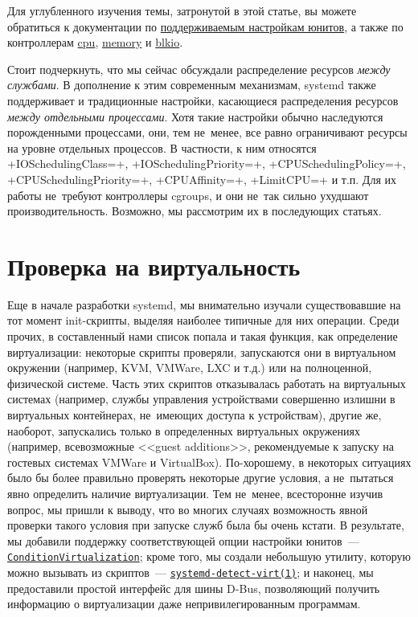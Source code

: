 \documentclass[10pt,oneside,a4paper]{article}
\newcommand{\hreftt}[2]{\href{#1}{\texttt{#2}}}
\begin{document}
Для углубленного изучения темы, затронутой в этой статье, вы можете обратиться к
документации по
\href{http://www.freedesktop.org/software/systemd/man/systemd.resource-control.html}%
{поддерживаемым настройкам юнитов}, а также по контроллерам 
\href{http://www.kernel.org/doc/Documentation/scheduler/sched-design-CFS.txt}{cpu},
\href{http://www.kernel.org/doc/Documentation/cgroups/memory.txt}{memory} и
\href{http://www.kernel.org/doc/Documentation/cgroups/blkio-controller.txt}{blkio}.

Стоит подчеркнуть, что мы сейчас обсуждали распределение ресурсов \emph{между
службами}. В дополнение к этим современным механизмам, systemd также
поддерживает и традиционные настройки, касающиеся распределения ресурсов
\emph{между отдельными процессами}. Хотя такие настройки обычно наследуются
порожденными процессами, они, тем не~менее, все равно ограничивают ресурсы
на уровне отдельных процессов. В частности, к ним относятся +IOSchedulingClass=+,
+IOSchedulingPriority=+, +CPUSchedulingPolicy=+, +CPUSchedulingPriority=+,
+CPUAffinity=+, +LimitCPU=+ и т.п. Для их работы не~требуют контроллеры cgroups,
и они не~так сильно ухудшают производительность. Возможно, мы рассмотрим их в
последующих статьях.

\section{Проверка на виртуальность}

Еще в начале разработки systemd, мы внимательно изучали существовавшие на тот
момент init-скрипты, выделяя наиболее типичные для них операции. Среди прочих, в
составленный нами список попала и такая функция, как определение виртуализации:
некоторые скрипты проверяли, запускаются они в виртуальном окружении (например,
KVM, VMWare, LXC и т.д.) или на полноценной, физической системе. Часть этих
скриптов отказывалась работать на виртуальных системах (например, службы
управления устройствами совершенно излишни в виртуальных контейнерах, не~имеющих
доступа к устройствам), другие же, наоборот, запускались только в определенных 
виртуальных окружениях (например, всевозможные <<guest additions>>,
рекомендуемые к запуску на гостевых системах VMWare и VirtualBox). По-хорошему,
в некоторых ситуациях было бы более правильно проверять некоторые другие
условия, а не~пытаться явно определить наличие виртуализации. Тем не~менее,
всесторонне изучив вопрос, мы пришли к выводу, что во многих случаях
возможность явной проверки такого условия при запуске служб была бы очень
кстати. В результате, мы добавили поддержку соответствующей опции настройки
юнитов~---
\hreftt{http://www.freedesktop.org/software/systemd/man/systemd.unit.html}{ConditionVirtualization};
кроме того, мы создали небольшую утилиту, которую можно вызывать из
скриптов~---
\hreftt{http://www.freedesktop.org/software/systemd/man/systemd-detect-virt.html}{systemd-detect-virt(1)};
и наконец, мы предоставили простой интерфейс для шины D-Bus, позволяющий
получить информацию о виртуализации даже непривилегированным программам. 
\end{document}
